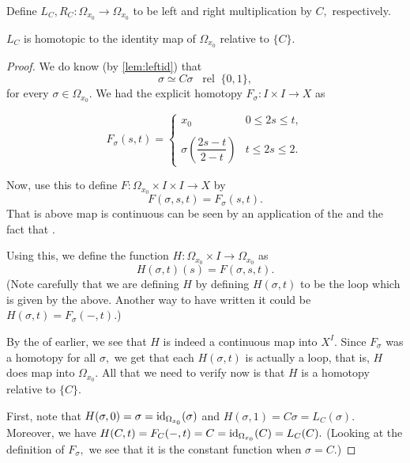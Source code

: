 \documentclass[12pt]{article}
\newcommand{\rel}{\;\;\operatorname{rel}\;}
\begin{document}
Define $L_C, R_C : \Omega_{x_0} \to \Omega_{x_0}$ to be left and right multiplication by $C,$ respectively.

\begin{prop}
	$L_C$ is homotopic to the identity map of $\Omega_{x_0}$ relative to $\{C\}.$
\end{prop}

\begin{proof} 
	We do know (by \cref{lem:leftid}) that 
	\begin{equation*} 
		\sigma\simeq C\sigma\rel\{0, 1\},
	\end{equation*}
	for every $\sigma\in\Omega_{x_0}.$ We had the explicit homotopy $F_{\sigma}:I\times I \to X$ as

	\begin{equation*} 
		F_\sigma(s, t) =\begin{cases}
			x_0 & 0 \le 2s \le t,\\~\\
    	\sigma\left(\dfrac{2s - t}{2 - t}\right) & t \le 2s \le 2.
		\end{cases}
	\end{equation*}

	Now, use this to define $F:\Omega_{x_0} \times I \times I \to X$ by
	\begin{equation*} 
		F(\sigma, s, t) = F_{\sigma}(s, t).
	\end{equation*}
	That is above map is continuous can be seen by an application of the  and the fact that .

	Using this, we define the function $H:\Omega_{x_0}\times I \to\Omega_{x_0}$ as
	\begin{equation*} 
		H(\sigma, t)(s) = F(\sigma, s, t).
	\end{equation*}
	(Note carefully that we are defining $H$ by defining $H(\sigma, t)$ to be the loop which is given by the above. Another way to have written it could be $H(\sigma, t) = F_{\sigma}(-, t).$)

	By the  of earlier, we see that $H$ is indeed a continuous map into $X^I.$ Since $F_{\sigma}$ was a homotopy for all $\sigma,$ we get that each $H(\sigma, t)$ is actually a loop, that is, $H$ does map into $\Omega_{x_0}.$
	All that we need to verify now is that $H$ is a homotopy relative to $\{C\}.$

	First, note that $H(\sigma, 0) = \sigma = \operatorname{id}_{\Omega_{x_0}}(\sigma)$ and $H(\sigma, 1) = C\sigma = L_C(\sigma).$\\
	Moreover, we have $H(C, t) = F_{C}(-, t) = C = \operatorname{id}_{\Omega_{x_0}}(C) = L_C(C).$ (Looking at the definition of $F_\sigma,$ we see that it is the constant function when $\sigma = C.$)
\end{proof}
\end{document}
